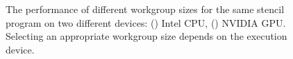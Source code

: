 \documentclass{acaces}
\begin{document}
\begin{figure}
{\begin{minipage}{.48\textwidth}
\begin{subfigure}[h]{.48\columnwidth}
      \vspace{-1.5em} %
      \caption{}
      \label{fig:motivation-2}
    \end{subfigure}
    \caption{%
      The performance of different workgroup sizes for the same stencil
      program on two different devices: ()
      Intel CPU, () NVIDIA GPU. Selecting an
      appropriate workgroup size depends on the execution device.%
    }
    \label{fig:motivation-arch}
  \end{minipage}%
}%
\hspace{2.5mm}
\end{figure}
\end{document}
